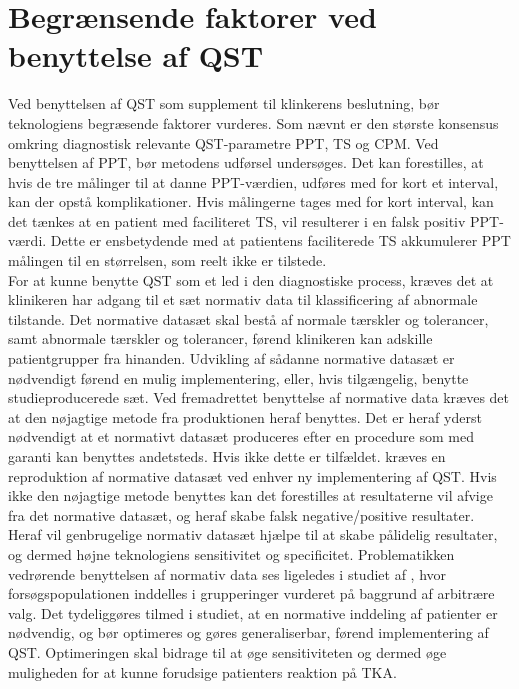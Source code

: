 \section{Begrænsende faktorer ved benyttelse af QST}
Ved benyttelsen af QST som supplement til klinkerens beslutning, bør teknologiens begræsende faktorer vurderes. Som nævnt er den største konsensus omkring diagnostisk relevante QST-parametre PPT, TS og CPM. Ved benyttelsen af PPT, bør metodens udførsel undersøges. Det kan forestilles, at hvis de tre målinger til at danne PPT-værdien, udføres med for kort et interval, kan der opstå komplikationer. Hvis målingerne tages med for kort interval, kan det tænkes at en patient med faciliteret TS, vil resulterer i en falsk positiv PPT-værdi. Dette er ensbetydende med at patientens faciliterede TS akkumulerer PPT målingen til en størrelsen, som reelt ikke er tilstede. \\
For at kunne benytte QST som et led i den diagnostiske process, kræves det at klinikeren har adgang til et sæt normativ data til klassificering af abnormale tilstande. Det normative datasæt skal bestå af normale tærskler og tolerancer, samt abnormale tærskler og tolerancer, førend klinikeren kan adskille patientgrupper fra hinanden. Udvikling af sådanne normative datasæt er nødvendigt førend en mulig implementering, eller, hvis tilgængelig, benytte studieproducerede sæt. Ved fremadrettet benyttelse af normative data kræves det at den nøjagtige metode fra produktionen heraf benyttes. Det er heraf yderst nødvendigt at et normativt datasæt produceres efter en procedure som med garanti kan benyttes andetsteds. Hvis ikke dette er tilfældet. kræves en reproduktion af normative datasæt ved enhver ny implementering af QST. Hvis ikke den nøjagtige metode benyttes kan det forestilles at resultaterne vil afvige fra det normative datasæt, og heraf skabe falsk negative/positive resultater. Heraf vil genbrugelige normativ datasæt  hjælpe til at skabe pålidelig resultater, og dermed højne teknologiens sensitivitet og specificitet.  \citep{Yarnitsky1997} Problematikken vedrørende benyttelsen af normativ data ses ligeledes i studiet af , hvor forsøgspopulationen inddelles i grupperinger vurderet på baggrund af arbitrære valg. Det tydeliggøres tilmed i studiet, at en normative inddeling af patienter er nødvendig, og bør optimeres og gøres generaliserbar, førend implementering af QST. Optimeringen skal bidrage til at øge sensitiviteten og dermed øge muligheden for at kunne forudsige patienters reaktion på TKA. \\
